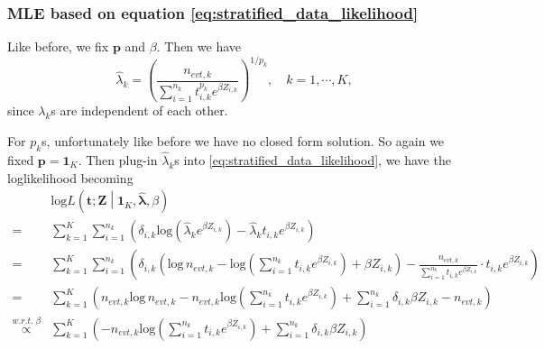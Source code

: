 \documentclass[a4paper,12pt]{article}
\begin{document}
\subsubsection{MLE based on equation \eqref{eq:stratified_data_likelihood}}
\label{sec:mle-based-}

Like before, we fix $\bm{p}$ and $\beta$. Then we have
\[
  \hat{\lambda}_k = \left(
    \frac{n_{evt, k}}{
      \sum\limits_{i = 1}^{n_k}t_{i, k}^{p_k}e^{\beta Z_{i, k}}
    }
  \right)^{1 / p_{k}}
  , \quad
  k = 1, \cdots, K, 
\]
since $\lambda_k$s are independent of each other.
\par
For $p_k$s, unfortunately like before we have no closed form solution. So again we fixed $\bm{p} = \bm{1}_K$. Then plug-in $\hat{\lambda}_k$s into \eqref{eq:stratified_data_likelihood}, we have the loglikelihood becoming
\[
  \begin{aligned}
    & \mathrm{log}L\left(
    \bm{t};\bm{Z}
    \middle|
    \bm{1}_K, \hat{\bm{\lambda}}, \beta
    \right)    \\
    =& \sum\limits_{k = 1}^K\sum\limits_{i = 1}^{n_k}\left(
       \delta_{i, k}
       \mathrm{log}\left(
       \hat{\lambda}_k
       e^{\beta Z_{i, k}}
       \right)
       - \hat{\lambda}_k t_{i, k}
       e^{\beta Z_{i, k}}
       \right)    \\
    =& \sum\limits_{k = 1}^K\sum\limits_{i = 1}^{n_k}\left(
       \delta_{i, k}\left(
       \mathrm{log}\,n_{evt, k}
       - \mathrm{log}\left(\sum\limits_{i = 1}^{n_k}t_{i, k}e^{\beta Z_{i, k}}\right)
       + \beta Z_{i, k}
       \right)
       - \frac{n_{evt, k}}{
       \sum\limits_{i = 1}^{n_k}t_{i, k}e^{\beta Z_{i, k}}
       }
       \cdot
       t_{i, k}e^{\beta Z_{i, k}}
       \right)    \\
    =& \sum\limits_{k = 1}^K\left(
       n_{evt, k}\mathrm{log}\,n_{evt, k}
       - n_{evt, k}\mathrm{log}\left(\sum\limits_{i = 1}^{n_k}t_{i, k}e^{\beta Z_{i, k}}\right)
       + \sum\limits_{i = 1}^{n_k}\delta_{i, k}\beta Z_{i, k}
       - n_{evt, k}
       \right)    \\
    \overset{w.r.t.\;\beta}{\propto}&
                                      \sum\limits_{k = 1}^K\left(
                                      - n_{evt, k}
                                      \mathrm{log}\left(
                                      \sum\limits_{i = 1}^{n_k}t_{i, k}e^{\beta Z_{i, k}}\right)
                                      + \sum\limits_{i = 1}^{n_k}\delta_{i, k}\beta Z_{i, k}
                                      \right)
  \end{aligned}
\]
\end{document}
